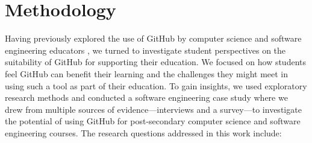 \section{Methodology}
Having previously explored the use of GitHub by computer science and software engineering educators \cite{zagalsky2015emergence}, we turned to investigate student perspectives on the suitability of GitHub for supporting their education. We focused on how students feel GitHub can benefit their learning and the challenges they might meet in using such a tool as part of their education. To gain insights, we used exploratory research methods \cite{easterbrook2008selecting} and conducted a software engineering case study \cite{yin2013case,runeson2012case} where we drew from multiple sources of evidence---interviews and a survey---to investigate the potential of using GitHub for post-secondary computer science and software engineering courses. The research questions addressed in this work include:

%

